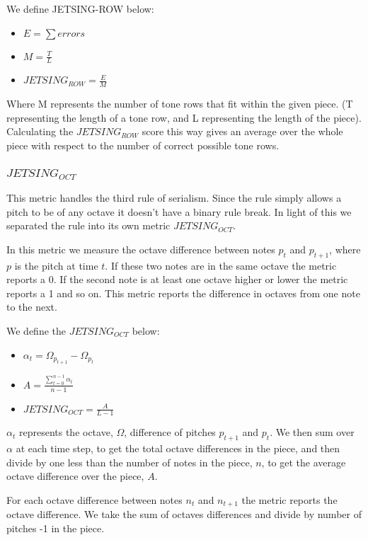 \documentclass[11pt]{article}
\begin{document}
We define JETSING-ROW below:
\begin{itemize}
    \item $E = \sum errors $
    \item $M = \frac{T}{L}$
    \item $JETSING_{ROW} = \frac{E}{M}$
\end{itemize}

Where M represents the number of tone rows that fit within the given piece.
(T representing the length of a tone row, and L representing the length of the piece).
Calculating the $JETSING_{ROW}$ score this way gives an average over the whole piece with respect to the number of correct possible tone rows.

\subsubsection{$JETSING_{OCT}$}
This metric handles the third rule of serialism.
Since the rule simply allows a pitch to be of any octave it doesn't have a binary rule break.
In light of this we separated the rule into its own metric $JETSING_{OCT}$.

In this metric we measure the octave difference between notes $p_t$ and $p_{t+1}$, where $p$ is the pitch at time $t$.
If these two notes are in the same octave the metric reports a 0.
If the second note is at least one octave higher or lower the metric reports a 1 and so on.
This metric reports the difference in octaves from one note to the next.

We define the $JETSING_{OCT}$ below:

\begin{itemize}
    \item $\alpha_t = \Omega_{p_{t+1}} - \Omega_{p_t}$
    \item $A = \frac{\sum_{t=0}^{n-1} \alpha_t}{n-1}$
    \item $JETSING_{OCT} = \frac{A}{L-1} $
\end{itemize}

$\alpha_t$ represents the octave, $\Omega$, difference of pitches $p_{t+1}$ and $p_t$.
We then sum over $\alpha$ at each time step, to get the total octave differences in the piece,
and then divide by one less than the number of notes in the piece, $n$, to get the average octave difference over the piece, $A$.

For each octave difference between notes $n_t$ and $n_{t+1}$ the metric reports the octave difference.
We take the sum of octaves differences and divide by number of pitches -1 in the piece.
\end{document}
